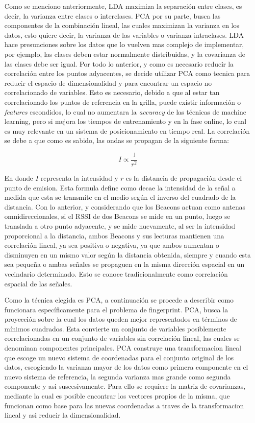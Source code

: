 Como se menciono anteriormente, LDA maximiza la separación entre clases, es decir, la varianza entre clases o interclases. PCA por su parte, busca las componentes de la combinación lineal, las cuales maximizan la varianza en los datos, esto quiere decir, la varianza de las variables o varianza intraclases. LDA hace presunciones sobre los datos que lo vuelven mas complejo de implementar, por ejemplo, las clases deben estar normalmente distribuidas, y la covarianza de las clases debe ser igual. Por todo lo anterior, y como es necesario reducir la correlación entre los puntos adyacentes, se decide utilizar PCA como tecnica para reducir el espacio de dimensionalidad y para encontrar un espacio no correlacionado de variables. Esto es necesario, debido a que al estar tan correlacionado los puntos de referencia en la grilla, puede existir información o \textit{features} escondidos, lo cual no aumentara la \textit{accuracy} de las técnicas de machine learning, pero si mejora los tiempos de entrenamiento y en la fase online, lo cual es muy relevante en un sistema de posicionamiento en tiempo real. La correlación se debe a que como es sabido, las ondas se propagan de la siguiente forma:

$$ I \propto \frac{1}{r^{2}}$$

En donde $I$ representa la intensidad y $r$ es la distancia de propagación desde el punto de emision. Esta formula define como decae la intensidad de la señal a medida que esta se transmite en el medio según el inverso del cuadrado de la distancia. Con lo anterior, y considerando que los Beacons actuan como antenas omnidireccionales, si el RSSI de dos Beacons se mide en un punto, luego se translada a otro punto adyacente, y se mide nuevamente,  al ser la intensidad proporcional a la distancia, ambos Beacons y sus lecturas mantienen una correlación lineal, ya sea positiva o negativa, ya que ambos aumentan o disminuyen en un mismo valor según la distancia obtenida, siempre y cuando esta sea pequeña o ambas señales se propaguen en la misma dirección espacial en un vecindario determinado. Esto se conoce tradicionalmente como correlación espacial de las señales.

Como la técnica elegida es PCA, a continuación se procede a describir como funcionara específicamente para el problema de fingerprint. PCA, busca la proyección sobre la cual los datos queden mejor representados en términos de mínimos cuadrados. Esta convierte un conjunto de variables posiblemente correlacionadas en un conjunto de variables sin correlación lineal, las cuales se denominan componentes principales. PCA construye una transformacion lineal que escoge un nuevo sistema de coordenadas para el conjunto original de los datos, escogiendo la varianza mayor de los datos como primera componente en el nuevo sistema de referencia, la segunda varianza mas grande como segunda componente y asi suscesivamente. Para ello se requiere la matriz de covarianzas, mediante la cual es posible encontrar los vectores propios de la misma, que funcionan como base para las nuevas coordenadas a traves de la transformacion lineal y asi reducir la dimensionalidad.

